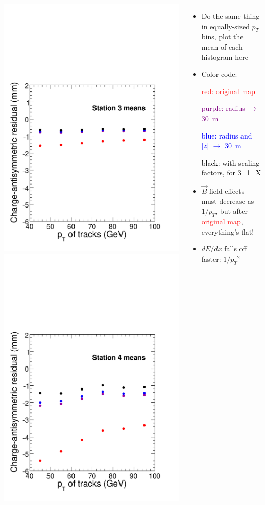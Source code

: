 \documentclass[compress]{beamer}
\begin{document}
\begin{frame}
\begin{columns}
\includegraphics[width=0.5\linewidth]{station3_vspt.pdf}
\includegraphics[width=0.5\linewidth]{station4_vspt.pdf}

\scriptsize
\begin{itemize}
\item Do the same thing in equally-sized $p_T$ bins, plot the mean of each histogram here

\item Color code:

\textcolor{red}{red: original map}

\textcolor{purple}{purple: radius $\to$ 30~m}

\textcolor{blue}{blue: radius and $|z|$ $\to$ 30~m}

\textcolor{black}{black: with scaling factors, for 3\_1\_X}

\item $\vec{B}$-field effects must decrease as $1/p_T$, but after
  \textcolor{red}{original map}, everything's flat!
\item $dE/dx$ falls off faster: $1/{p_T}^2$
\end{itemize}
\end{columns}
\end{frame}
\end{document}
